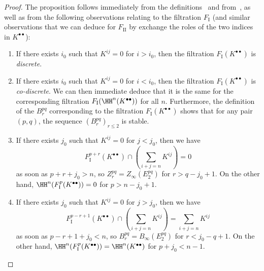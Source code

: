 \begin{proof}
The proposition follows immediately from the definitions~ and from~, as well as from the following observations relating to the filtration $F_\mathrm{I}$ (and similar observations that we can deduce for $F_\mathrm{II}$ by exchange the roles of the two indices in $K^{\bullet\bullet}$):
\begin{enumerate}
  \item[{$1^{\circ}$}] If there exists $i_0$ such that $K^{ij}=0$ for $i>i_0$, then the filtration $F_\mathrm{I}(K^{\bullet\bullet})$ is \emph{discrete}.
  \item[{$2^{\circ}$}] If there exists $i_0$ such that $K^{ij}=0$ for $i<i_0$, then the filtration $F_\mathrm{I}(K^{\bullet\bullet})$ is \emph{co-discrete}.
    We can then immediate deduce that it is the same for the corresponding filtration $F_\mathrm{I}(\HH^n(K^{\bullet\bullet}))$ for all $n$. 
    Furthermore, the definition of the $B_{r}^{pq}$ corresponding to the filtration $F_\mathrm{I}(K^{\bullet\bullet})$  shows that for any pair $(p,q)$, the sequence $(B_{r}^{pq})_{r\leq{2}}$ is stable.
  \item[{$3^{\circ}$}] If there exists $j_0$ such that $K^{ij}=0$ for $j<j_0$, then we have 
    \[
      F_\mathrm{I}^{p+r}(K^{\bullet\bullet})
      \cap (\sum_{i+j=n}K^{ij})
      = 0
    \]
    as soon as $p+r+j_{0}>n$, so $Z_{r}^{pq} = Z_\infty(E_2^{pq})$ for $r>q-j_{0}+1$.
    On the other hand, $\HH^{n}(F_\mathrm{I}^{p}(K^{\bullet\bullet})) = 0$ for $p>n-j_{0}+1$.
  \item[{$4^{\circ}$}] If there exists $j_0$ such that $K^{ij}=0$ for $j>j_0$, then we have 
    \[
      F_\mathrm{I}^{p-r+1}(K^{\bullet\bullet})
      \cap (\sum_{i+j=n}K^{ij})
      = \sum_{i+j=n}K^{ij}
    \]
    as soon as $p-r+1+j_{0}<n$, so $B_{r}^{pq} = B_\infty(E_2^{pq})$ for $r<j_{0}-q+1$.
    On the other hand, $\HH^{n}(F_\mathrm{I}^{p}(K^{\bullet\bullet})) = \HH^{n}(K^{\bullet\bullet})$ for $p+j_{0}<n-1$.
\end{enumerate}
\end{proof}

